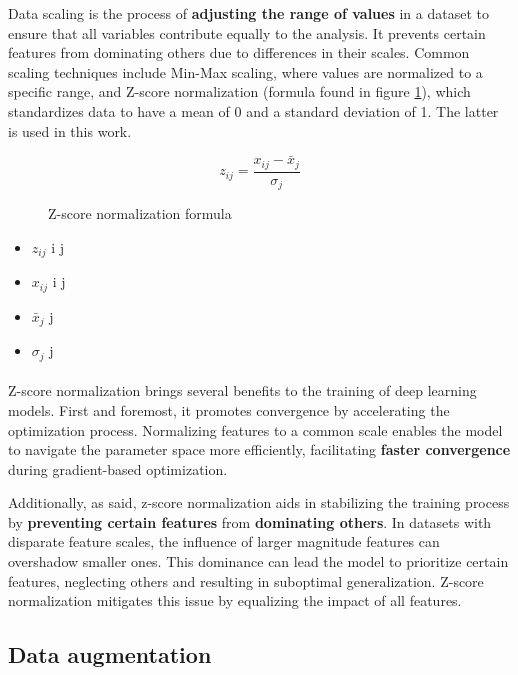 Data scaling is the process of \textbf{adjusting the range of values} in a dataset to ensure that all variables contribute equally to the analysis. It prevents certain features from dominating others due to differences in their scales. Common scaling techniques include Min-Max scaling, where values are normalized to a specific range, and Z-score normalization (formula found in figure \ref{eq:standardization}), which standardizes data to have a mean of 0 and a standard deviation of 1. The latter is used in this work.

\begin{figure}
\[ z_{ij} = \frac{{x_{ij} - \bar{x}_j}}{{\sigma_j}} \]
\caption{Z-score normalization formula}
\label{eq:standardization}
\end{figure}
\begin{itemize}[noitemsep]
  \item $z_{ij}$  i j
  \item $x_{ij}$  i j 
  \item $\bar{x}_j$  j 
  \item $\sigma_j$  j
\end{itemize}


\paragraph{}Z-score normalization brings several benefits to the training of deep learning models. First and foremost, it promotes convergence by accelerating the optimization process. Normalizing features to a common scale enables the model to navigate the parameter space more efficiently, facilitating \textbf{faster convergence} during gradient-based optimization.

Additionally, as said, z-score normalization aids in stabilizing the training process by \textbf{preventing certain features }from\textbf{ dominating others}. In datasets with disparate feature scales, the influence of larger magnitude features can overshadow smaller ones. This dominance can lead the model to prioritize certain features, neglecting others and resulting in suboptimal generalization. Z-score normalization mitigates this issue by equalizing the impact of all features.

\subsection{Data augmentation}


